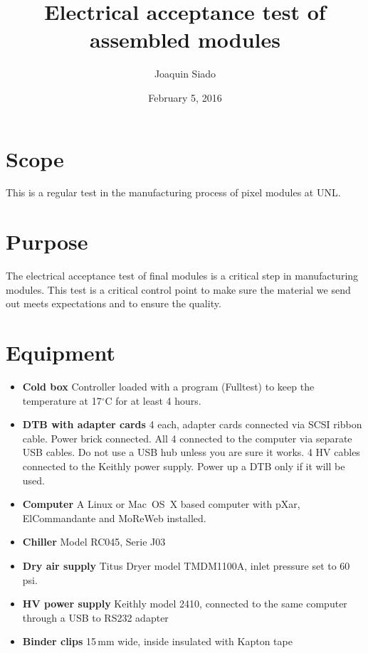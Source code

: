 \documentclass[12pt]{unlsilabsop}
\title{Electrical acceptance test of assembled modules}
\date{February 5, 2016}
\author{Joaquin Siado}
\begin{document}
\maketitle

\section{Scope}
This is a regular test in the manufacturing process of pixel modules at UNL.

\section{Purpose}
The electrical acceptance test of final modules is a critical step in manufacturing modules. This test is a critical control point to make sure the material we send out meets expectations and to ensure the quality.



\section{Equipment}

\begin{itemize}
\item \textbf{Cold box} Controller loaded with a program (Fulltest) to keep the temperature at 17$^\circ$C for at least 4 hours.
\item \textbf{DTB with adapter cards} 4 each, adapter cards connected via SCSI ribbon cable. Power brick connected. All 4 connected to the computer via separate USB cables. Do not use a USB hub unless you are sure it works. 4 HV cables connected to the Keithly power supply. Power up a DTB only if it will be used.
\item \textbf{Computer} A Linux or Mac~OS~X based computer with pXar, ElCommandante and MoReWeb installed.
\item \textbf{Chiller} Model RC045, Serie J03
\item \textbf{Dry air supply} Titus Dryer model TMDM1100A, inlet pressure set to 60\,psi.
\item \textbf{HV power supply} Keithly model 2410, connected to the same computer through a USB to RS232 adapter
\item \textbf{Binder clips} 15\,mm wide, inside insulated with Kapton tape
\end{itemize}
\end{document}
